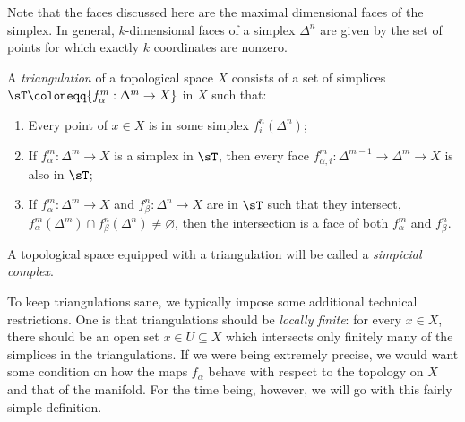 \documentclass{axolotl}
\begin{document}
Note that the faces discussed here are the maximal dimensional faces of the
simplex. In general, \(k\)-dimensional faces of a simplex \(\Delta^n\) are given
by the set of points for which exactly \(k\) coordinates are nonzero.

A \emph{triangulation} of a topological space \(X\) consists of a set of simplices
\(\sT \coloneqq \{f_\alpha^m: \Delta^m \to X\}\) in \(X\) such that:
\begin{enumerate}
  \item Every point of \(x \in X\) is in some simplex \(f_i^n(\Delta^n)\);
  \item If \(f_\alpha^m: \Delta^m \to X\) is a simplex in \(\sT\), then every
    face \(f_{\alpha,i}^m: \Delta^{m-1} \to \Delta^m \to X\) is also in \(\sT\);
  \item If \(f_\alpha^m: \Delta^m \to X\) and \(f_\beta^n: \Delta^n \to X\) are in
    \(\sT\) such that they intersect, \(f_\alpha^m(\Delta^m) \cap f_\beta^n(\Delta^n) \neq \varnothing\),
    then the intersection is a face of both \(f_\alpha^m\) and \(f_\beta^n\).
\end{enumerate}
A topological space equipped with a triangulation will be called a
\emph{simpicial complex}.

To keep triangulations sane, we typically impose some additional technical restrictions.
One is that triangulations should be \emph{locally finite}: for every \(x \in X\),
there should be an open set \(x \in U \subseteq X\) which intersects only finitely
many of the simplices in the triangulations. If we were being extremely precise, we
would want some condition on how the maps \(f_\alpha\) behave with respect to the
topology on \(X\) and that of the manifold. For the time being, however, we will
go with this fairly simple definition.
\end{document}
